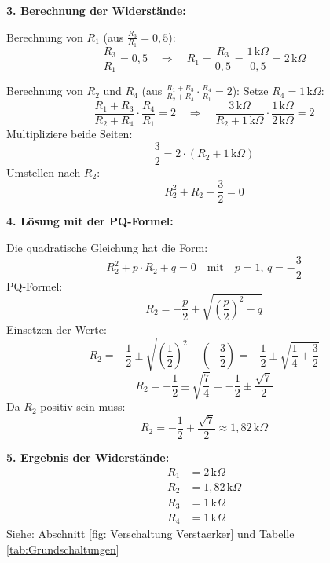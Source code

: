{  \textbf{3. Berechnung der Widerstände:}

  Berechnung von \( R_1 \) (aus \( \frac{R_3}{R_1} = 0{,}5 \)):
  \[
    \frac{R_3}{R_1} = 0{,}5 \quad \Rightarrow \quad R_1 = \frac{R_3}{0{,}5} = \frac{1\,\mathrm{k}\Omega}{0{,}5} = 2\,\mathrm{k}\Omega
  \]

  Berechnung von \( R_2 \) und \( R_4 \) (aus \( \frac{R_1 + R_3}{R_2 + R_4} \cdot \frac{R_4}{R_1} = 2 \)):
  Setze \( R_4 = 1\,\mathrm{k}\Omega \):
  \[
    \frac{R_1 + R_3}{R_2 + R_4} \cdot \frac{R_4}{R_1} = 2 \quad \Rightarrow \quad \frac{3\,\mathrm{k}\Omega}{R_2 + 1\,\mathrm{k}\Omega} \cdot \frac{1\,\mathrm{k}\Omega}{2\,\mathrm{k}\Omega} = 2
  \]
  Multipliziere beide Seiten:
  \[
    \frac{3}{2} = 2 \cdot (R_2 + 1\,\mathrm{k}\Omega)
  \]
  Umstellen nach \( R_2 \):
  \[
    R_2^2 + R_2 - \frac{3}{2} = 0
  \]


  \textbf{4. Lösung mit der PQ-Formel:}

  Die quadratische Gleichung hat die Form:
  \[
    R_2^2 + p \cdot R_2 + q = 0 \quad \text{mit} \quad p = 1, \, q = -\frac{3}{2}
  \]
  PQ-Formel:
  \[
    R_2 = -\frac{p}{2} \pm \sqrt{\left( \frac{p}{2} \right)^2 - q}
  \]
  Einsetzen der Werte:
  \[
    R_2 = -\frac{1}{2} \pm \sqrt{\left( \frac{1}{2} \right)^2 - \left( -\frac{3}{2} \right)} = -\frac{1}{2} \pm \sqrt{\frac{1}{4} + \frac{3}{2}}
  \]
  \[
    R_2 = -\frac{1}{2} \pm \sqrt{\frac{7}{4}} = -\frac{1}{2} \pm \frac{\sqrt{7}}{2}
  \]
  Da \( R_2 \) positiv sein muss:
  \[
    R_2 = -\frac{1}{2} + \frac{\sqrt{7}}{2} \approx 1{,}82\,\mathrm{k}\Omega
  \]


  \textbf{5. Ergebnis der Widerstände:}
  \begin{align*}
    R_1 & = 2\,\mathrm{k}\Omega      \\
    R_2 & = 1{,}82\,\mathrm{k}\Omega \\
    R_3 & = 1\,\mathrm{k}\Omega      \\
    R_4 & = 1\,\mathrm{k}\Omega
  \end{align*}
  Siehe: Abschnitt \ref{fig: Verschaltung Verstaerker} und Tabelle \ref{tab:Grundschaltungen}
}
